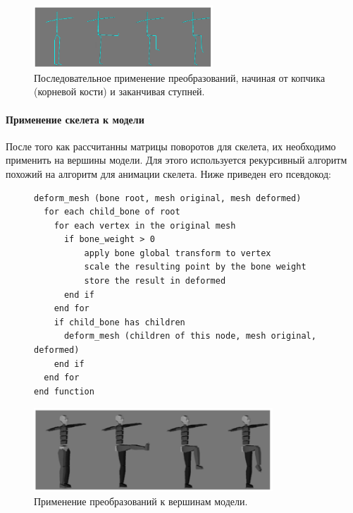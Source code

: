 \begin{figure}[h!]
    \centering
    \includegraphics[width=0.6\textwidth]{forward_kinematics_skeleton.png}
    \caption{\small{Последовательное применение преобразований, начиная от копчика (корневой кости) и заканчивая ступней.}}
\end{figure}


\paragraph{Применение скелета к модели}

После того как рассчитанны матрицы поворотов для скелета, их необходимо применить на вершины модели.
Для этого используется рекурсивный алгоритм похожий на алгоритм для анимации скелета. Ниже приведен его псевдокод:


\begin{figure}[h!]
\begin{small}
\begin{verbatim}
deform_mesh (bone root, mesh original, mesh deformed)
  for each child_bone of root
    for each vertex in the original mesh
      if bone_weight > 0
          apply bone global transform to vertex
          scale the resulting point by the bone weight
          store the result in deformed
      end if
    end for
    if child_bone has children
      deform_mesh (children of this node, mesh original, deformed)
    end if
  end for
end function
\end{verbatim}
\end{small}
\end{figure}

\begin{figure}[h!]
    \centering
    \includegraphics[width=0.8\textwidth]{forward_kinematics.png}
    \caption{\scriptsize{Применение преобразований к вершинам модели.}}

\end{figure}



